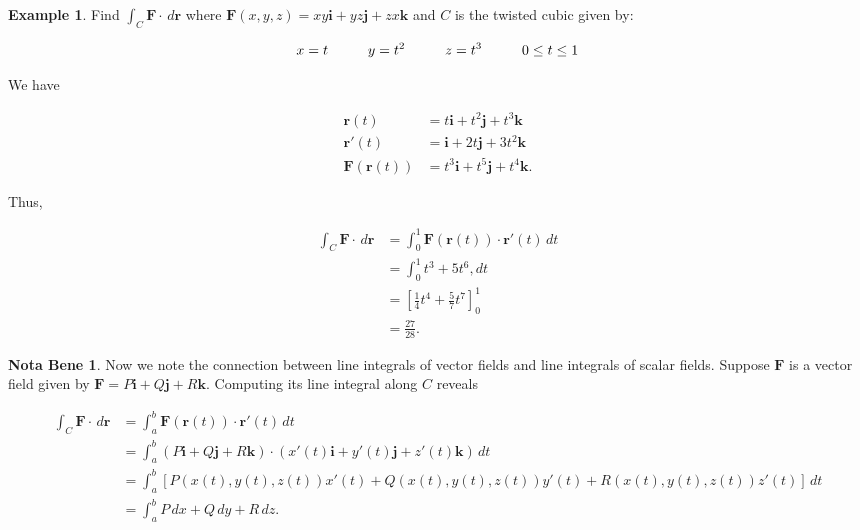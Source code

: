 \documentclass[11pt,oneside,english]{amsart}
\theoremstyle{definition}
\newtheorem*{example}{Example}
\newtheorem*{note}{Nota Bene}
\newcommand{\pspace}{\hspace{10mm}}
\begin{document}
\begin{example}
Find $\displaystyle \int_C\mathbf{F}\cdot\,d\mathbf{r}$ where $\mathbf{F}(x,y,z)=xy\mathbf{i}+yz\mathbf{j}+zx\mathbf{k}$ and $C$ is the twisted cubic given by:

\[
x=t\pspace y=t^2\pspace z=t^3\pspace 0\leq t\leq 1
\]

\begin{multicols}{2}
We have

\begin{align*}
\mathbf{r}(t)&=t\mathbf{i}+t^2\mathbf{j}+t^3\mathbf{k}\\[2mm]
\mathbf{r}'(t)&=\mathbf{i}+2t\mathbf{j}+3t^2\mathbf{k}\\[2mm]
\mathbf{F}(\mathbf{r}(t))&=t^3\mathbf{i}+t^5\mathbf{j}+t^4\mathbf{k}.
\end{align*}

\columnbreak
Thus,

\begin{align*}
\int_C\mathbf{F}\cdot\,d\mathbf{r}&= \int_0^1\mathbf{F}(\mathbf{r}(t))\cdot\mathbf{r}'(t)\,dt\\[2mm]
&=\int_0^1t^3+5t^6,dt\\[2mm]
&=\left[\frac{1}{4}t^4+\frac{5}{7}t^7\right]_0^1\\[2mm]
&=\frac{27}{28}.
\end{align*}

\end{multicols}
\end{example}

\begin{note}
Now we note the connection between line integrals of vector fields and line integrals of scalar fields. Suppose $\mathbf{F}$ is a vector field given by $\mathbf{F}=P\mathbf{i}+Q\mathbf{j}+R\mathbf{k}$. Computing its line integral along $C$ reveals

\begin{align*}
\int_C\mathbf{F}\cdot\,d\mathbf{r}&= \int_a^b\mathbf{F}(\mathbf{r}(t))\cdot\mathbf{r}'(t)\,dt\\[2mm]
&=\int_a^b (P\mathbf{i}+Q\mathbf{j}+R\mathbf{k})\cdot(x'(t)\mathbf{i}+y'(t)\mathbf{j}+z'(t)\mathbf{k})\,dt\\[2mm]
&=\int_a^b\left[P(x(t),y(t),z(t))x'(t)+Q(x(t),y(t),z(t))y'(t)+R(x(t),y(t),z(t))z'(t)\right]\,dt\\[2mm]
&=\int_a^bP\,dx+Q\,dy+R\,dz.
\end{align*}

\end{note}
\end{document}
